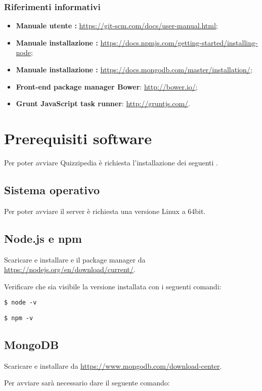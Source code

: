 \documentclass[a4paper, titlepage]{article}
\begin{document}
	\subsubsection{Riferimenti informativi}
	\begin{itemize}
		\item \textbf{Manuale utente :} \url{https://git-scm.com/docs/user-manual.html};
		\item \textbf{Manuale installazione :} \url{https://docs.npmjs.com/getting-started/installing-node};
		\item \textbf{Manuale installazione :} \url{https://docs.mongodb.com/master/installation/};
		\item \textbf{Front-end package manager Bower}: \url{http://bower.io/};
		\item \textbf{Grunt JavaScript task runner}: \url{http://gruntjs.com/}.
	\end{itemize}
	\newpage
	
	\section{Prerequisiti software}
	Per poter avviare Quizzipedia è richiesta l'installazione dei seguenti .
	
	\subsection{Sistema operativo}
	Per poter avviare il server è richiesta una versione Linux  a 64bit.
	
	\subsection{Node.js e npm}
	Scaricare e installare  e il package manager  da \url{https://nodejs.org/en/download/current/}.
	
	Verificare che sia visibile la versione installata con i seguenti comandi:
	
	\texttt{\$ node -v}
	
	\texttt{\$ npm -v}

	\subsection{MongoDB}
	Scaricare e installare  da \url{https://www.mongodb.com/download-center}.
	
	Per avviare  sarà necessario dare il seguente comando:
	
\end{document}
